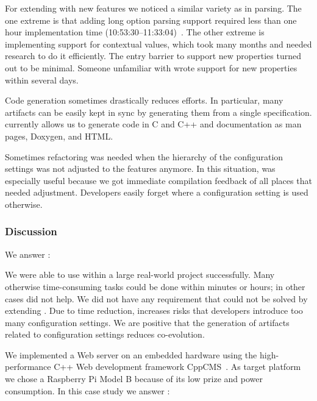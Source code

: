 For extending  with new features we noticed a similar variety as in parsing.
The one extreme is that adding long option parsing support required less than one hour implementation time (10:53:30--11:33:04)~\cite{raab2015kps}.
The other extreme is implementing support for contextual values, which took many months and needed research to do it efficiently.
The entry barrier to support new properties turned out to be minimal.
Someone unfamiliar with \elektra{} wrote support for new properties within several days.

Code generation sometimes drastically reduces efforts.
In particular, many artifacts can be easily kept in sync by generating them from a single specification.
 currently allows us to generate code in C and C++ and documentation as man pages, Doxygen, and HTML.

Sometimes refactoring was needed when the hierarchy of the configuration settings was not adjusted to the features anymore.
In this situation,  was especially useful because we got immediate compilation feedback of all places that needed adjustment.
Developers easily forget where a configuration setting is used otherwise.


\subsubsection{Discussion}

We answer :
\rqImplicationDevelopmentTime*

\begin{finding}
We were able to use \elektra{} within a large real-world project successfully.
Many otherwise time-consuming tasks could be done within minutes or hours; in other cases \elektra{} did not help.
We did not have any requirement that could not be solved by extending \elektra{}.
Due to time reduction, \elektra{} increases risks that developers introduce too many configuration settings.
We are positive that the generation of artifacts related to configuration settings reduces co-evolution.
\end{finding}





\label{sec:implication-embedded}

We implemented a Web server on an embedded hardware using the high-performance C++ Web development framework CppCMS~\cite{beilis2015cppcms}.
As target platform we chose a Raspberry Pi\textsuperscript{\textregistered} Model B because of its low prize and power consumption.
In this case study we answer :
\rqImplicationEmbedded*


